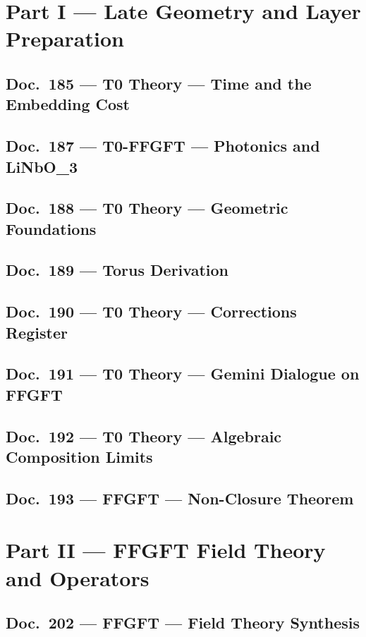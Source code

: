 	\part{Part I --- Late Geometry and Layer Preparation}
	\chapter{Doc.~185 --- T0 Theory — Time and the Embedding Cost}
	
	\chapter{Doc.~187 --- T0-FFGFT — Photonics and LiNbO_3}
	
	\chapter{Doc.~188 --- T0 Theory — Geometric Foundations}
	
	\chapter{Doc.~189 --- Torus Derivation}
	
	\chapter{Doc.~190 --- T0 Theory — Corrections Register}
	
	\chapter{Doc.~191 --- T0 Theory — Gemini Dialogue on FFGFT}
	
	\chapter{Doc.~192 --- T0 Theory — Algebraic Composition Limits}
	
	\chapter{Doc.~193 --- FFGFT — Non-Closure Theorem}
	
	\part{Part II --- FFGFT Field Theory and Operators}
	\chapter{Doc.~202 --- FFGFT — Field Theory Synthesis}
	
